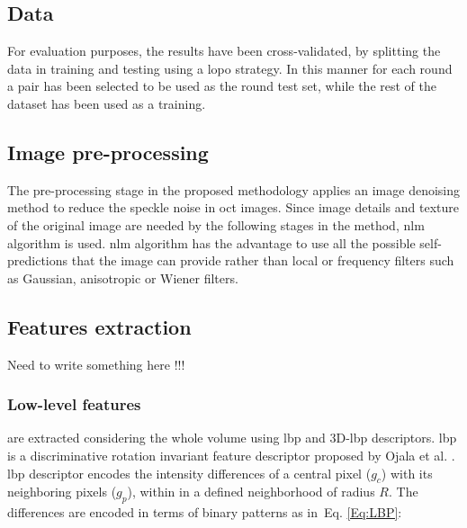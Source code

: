 \subsection{Data}
\color{red}{
\begin{itemize}
  \item cross-validation
  \item our dataset
  \item DUC dataset
\end{itemize}}\color{black}

For evaluation purposes, the results have been cross-validated, by splitting the data in training and testing using a \ac{lopo} strategy. In this manner for each round a pair \color{red}{dce,normal} has been selected to be used as the round test set, while the rest of the dataset has been used as a training. \color{black}

\color{red}{The dataset blablablabal...}\color{black}
\color{red}{The duc dataset blabla bla...}\color{black}

\subsection{Image pre-processing}
The pre-processing stage in the proposed methodology applies an image denoising method to reduce the speckle noise in \ac{oct} images. Since image details and texture of the original image are needed by the following stages in the method, \ac{nlm} algorithm \cite{buades2005non} is used. \ac{nlm} algorithm has the advantage to use all the possible self-predictions that the image can provide \cite{buades2005non} rather than local or frequency filters such as Gaussian, anisotropic or Wiener filters. \color{black}


\subsection{Features extraction}
Need to write something here !!!


\subsubsection{Low-level features} are extracted considering the whole volume using \ac{lbp} and 3D-\ac{lbp} descriptors. 
\ac{lbp} is a discriminative rotation invariant feature descriptor proposed by Ojala et al. \cite{ojala2002multiresolution}. 
\ac{lbp} descriptor encodes the intensity differences of a central pixel ($g_c$) with its neighboring pixels ($g_{p}$), within in a defined neighborhood of radius $R$. The differences are encoded in terms of binary patterns as in~Eq. \ref{Eq:LBP}: 

